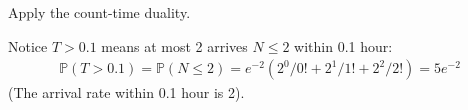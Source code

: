 

\setcounter{theorem}{44}
\begin{exercise}[BH.5.45]
    \begin{hint}
        Apply the count-time duality.
    \end{hint}
\begin{solution}
    Notice $T>0.1$ means at most 2 arrives $N\leq 2$  within 0.1 hour:
	\begin{align*}
		\mathbb{P}(T>0.1) = \mathbb{P}(N\leq 2) = e^{-2}\left(2^0/0!+2^1/1!+2^2/2! \right)=5e^{-2}
	\end{align*}
	(The arrival rate within 0.1 hour is 2).
\end{solution}
\end{exercise}


